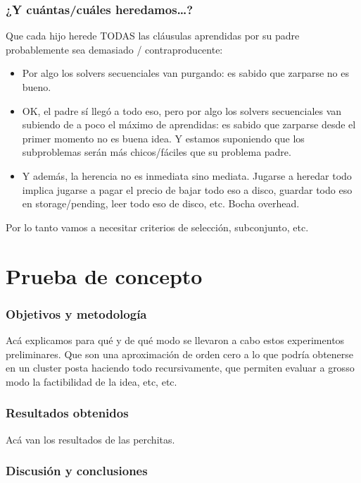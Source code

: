 \subsubsection{¿Y cuántas/cuáles heredamos\ldots?}

Que cada hijo herede TODAS las cláusulas aprendidas por su padre probablemente sea demasiado / contraproducente:
\begin{itemize}
\item Por algo los solvers secuenciales van purgando: es sabido que zarparse no es bueno.
\item OK, el padre sí llegó a todo eso, pero por algo los solvers secuenciales van subiendo de a poco el máximo de aprendidas: es sabido que zarparse desde el primer momento no es buena idea. Y estamos suponiendo que los subproblemas serán más chicos/fáciles que su problema padre.
\item Y además, la herencia no es inmediata sino mediata. Jugarse a heredar todo implica jugarse a pagar el precio de bajar todo eso a disco, guardar todo eso en storage/pending, leer todo eso de disco, etc. Bocha overhead.
\end{itemize}

Por lo tanto vamos a necesitar criterios de selección, subconjunto, etc.


\section{Prueba de concepto}

\subsubsection{Objetivos y metodología}

Acá explicamos para qué y de qué modo se llevaron a cabo estos experimentos preliminares. Que son una aproximación de orden cero a lo que podría obtenerse en un cluster posta haciendo todo recursivamente, que permiten evaluar a grosso modo la factibilidad de la idea, etc, etc.

\subsubsection{Resultados obtenidos}

Acá van los resultados de las perchitas.

\subsubsection{Discusión y conclusiones}

